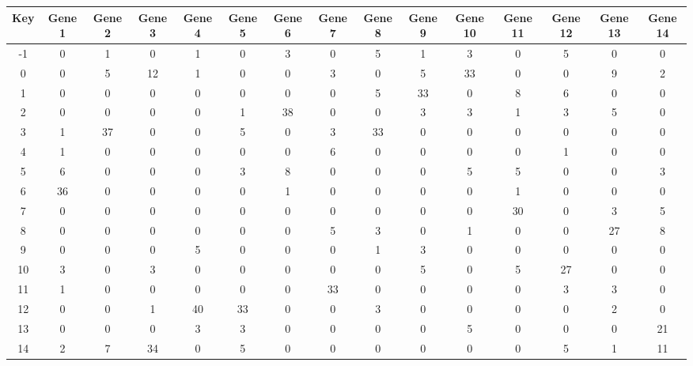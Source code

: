 \begin{tabular}{|c|c|c|c|c|c|c|c|c|c|c|c|c|c|c|}
\hline
Key & Gene 1 & Gene 2 & Gene 3 & Gene 4 & Gene 5 & Gene 6 & Gene 7 & Gene 8 & Gene 9 & Gene 10 & Gene 11 & Gene 12 & Gene 13 & Gene 14 \\
\hline
-1 & 0 & 1 & 0 & 1 & 0 & 3 & 0 & 5 & 1 & 3 & 0 & 5 & 0 & 0 \\
0 & 0 & 5 & 12 & 1 & 0 & 0 & 3 & 0 & 5 & 33 & 0 & 0 & 9 & 2 \\
1 & 0 & 0 & 0 & 0 & 0 & 0 & 0 & 5 & 33 & 0 & 8 & 6 & 0 & 0 \\
2 & 0 & 0 & 0 & 0 & 1 & 38 & 0 & 0 & 3 & 3 & 1 & 3 & 5 & 0 \\
3 & 1 & 37 & 0 & 0 & 5 & 0 & 3 & 33 & 0 & 0 & 0 & 0 & 0 & 0 \\
4 & 1 & 0 & 0 & 0 & 0 & 0 & 6 & 0 & 0 & 0 & 0 & 1 & 0 & 0 \\
5 & 6 & 0 & 0 & 0 & 3 & 8 & 0 & 0 & 0 & 5 & 5 & 0 & 0 & 3 \\
6 & 36 & 0 & 0 & 0 & 0 & 1 & 0 & 0 & 0 & 0 & 1 & 0 & 0 & 0 \\
7 & 0 & 0 & 0 & 0 & 0 & 0 & 0 & 0 & 0 & 0 & 30 & 0 & 3 & 5 \\
8 & 0 & 0 & 0 & 0 & 0 & 0 & 5 & 3 & 0 & 1 & 0 & 0 & 27 & 8 \\
9 & 0 & 0 & 0 & 5 & 0 & 0 & 0 & 1 & 3 & 0 & 0 & 0 & 0 & 0 \\
10 & 3 & 0 & 3 & 0 & 0 & 0 & 0 & 0 & 5 & 0 & 5 & 27 & 0 & 0 \\
11 & 1 & 0 & 0 & 0 & 0 & 0 & 33 & 0 & 0 & 0 & 0 & 3 & 3 & 0 \\
12 & 0 & 0 & 1 & 40 & 33 & 0 & 0 & 3 & 0 & 0 & 0 & 0 & 2 & 0 \\
13 & 0 & 0 & 0 & 3 & 3 & 0 & 0 & 0 & 0 & 5 & 0 & 0 & 0 & 21 \\
14 & 2 & 7 & 34 & 0 & 5 & 0 & 0 & 0 & 0 & 0 & 0 & 5 & 1 & 11 \\
\hline
\end{tabular}